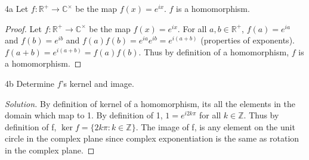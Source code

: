 \documentclass{article}
\newcommand{\C}{\mathbb{C}}
\newcommand{\R}{\mathbb{R}}
\newcommand{\Z}{\mathbb{Z}}
\newenvironment{solution}
{\renewcommand\qedsymbol{$\blacksquare$}\begin{proof}[Solution]}
{\end{proof}}
\begin{document}
\bigskip

\begin{claim}{4a}
    Let $f :\R^+ \to \C^\times$ be the map $f(x) = e^{ix}$. $f$ is a homomorphism.
\end{claim}
\begin{proof}
    Let $f :\R^+ \to \C^\times$ be the map $f(x) = e^{ix}$. For all $a, b \in \R^+$, $f(a) = e^{ia}$ and $f(b)=e^{ib}$ and $f(a)f(b) = e^{ia}e^{ib} = e^{i(a + b)}$ (properties of exponents). $f(a+b) = e^{i(a + b)} = f(a)f(b)$. Thus by definition of a homomorphism, $f$ is a homomorphism.
\end{proof}

\begin{PROB}{4b}\label{Problem 4b.}
    Determine $f$'s kernel and image.
\end{PROB}
\begin{solution}
    By definition of kernel of a homomorphism, its all the elements in the domain which map to 1. By definition of 1, $1 = e^{i2k\pi}$ for all $k \in \Z$. Thus by definition of f, $\ker f = \{2k\pi : k \in \Z\}$. The image of f, is any element on the unit circle in the complex plane since complex exponentiation is the same as rotation in the complex plane.
\end{solution}

\bigskip
\end{document}
